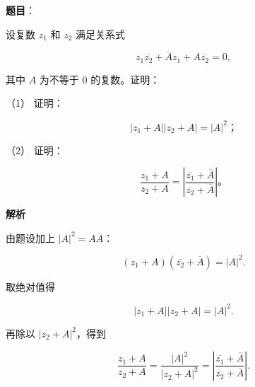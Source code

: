 \begin{answer}

\textbf{题目}：

设复数 $z_1$ 和 $z_2$ 满足关系式

\nopagebreak[4]
\[
z_1\overline{z_2}+\overline A z_1+A\overline{z_2}=0,
\]

其中 $A$ 为不等于 0 的复数。证明：

（1） 证明：

\nopagebreak[4]
\[
|z_1+A||z_2+A|=|A|^2\text{；}
\]

（2） 证明：

\nopagebreak[4]
\[
\frac{z_1+A}{z_2+A}
=\left|
\frac{\overline{z_1}+\overline A}
{\overline{z_2}+\overline A}
\right|\text{。}
\]

\textbf{解析}


由题设加上 $|A|^2=A\overline A$：

\nopagebreak[4]
\[
(z_1+A)(\overline{z_2}+\overline A)=|A|^2.
\]

取绝对值得

\nopagebreak[4]
\[
|z_1+A||z_2+A|=|A|^2.
\]


再除以 $|z_2+A|^2$，得到

\nopagebreak[4]
\[
\frac{z_1+A}{z_2+A}
=\frac{|A|^2}{|z_2+A|^2}
=\left|
\frac{\overline{z_1}+\overline A}
{\overline{z_2}+\overline A}
\right|.
\]



\end{answer}
